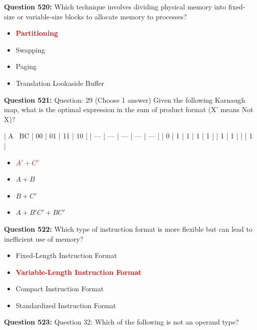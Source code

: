 \documentclass[12pt,a4paper]{article}
\begin{document}
\vspace{0.5cm}

\textbf{Question 520:} Which technique involves dividing physical memory into fixed-size or variable-size blocks to allocate memory to processes?

\begin{itemize}
    \item[\textbf{A.}] \textcolor{red}{\textbf{Partitioning}}
    \item[\textbf{B.}] Swapping
    \item[\textbf{C.}] Paging
    \item[\textbf{D.}] Translation Lookaside Buffer
\end{itemize}

\vspace{0.5cm}

\textbf{Question 521:} Question: 29 (Choose 1 answer) Given the following Karnaugh map, what is the optimal expression in the sum of product format (X' means Not X)?

| A \ BC | 00 | 01 | 11 | 10 |
| --- | --- | --- | --- | --- |
| 0 | 1 | 1 | 1 | 1 |
| 1 | 1 | | | 1 |

\begin{itemize}
    \item[\textbf{A.}] \textcolor{red}{\textbf{$A' + C'$}}
    \item[\textbf{B.}] $A + B$
    \item[\textbf{C.}] $B + C'$
    \item[\textbf{D.}] $A + B'C' + BC'$
\end{itemize}

\vspace{0.5cm}

\textbf{Question 522:} Which type of instruction format is more flexible but can lead to inefficient use of memory?

\begin{itemize}
    \item[\textbf{A.}] Fixed-Length Instruction Format
    \item[\textbf{B.}] \textcolor{red}{\textbf{Variable-Length Instruction Format}}
    \item[\textbf{C.}] Compact Instruction Format
    \item[\textbf{D.}] Standardized Instruction Format
\end{itemize}

\vspace{0.5cm}

\textbf{Question 523:} Question 32: Which of the following is not an operand type?
\end{document}

